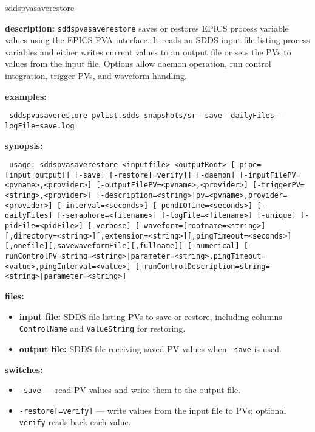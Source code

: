 \begin{sddsprog}{sddspvasaverestore}
\item \textbf{description:}
  \verb+sddspvasaverestore+ saves or restores EPICS process variable values using the EPICS PVA
  interface. It reads an SDDS input file listing process variables and either writes current
  values to an output file or sets the PVs to values from the input file. Options allow daemon
  operation, run control integration, trigger PVs, and waveform handling.
\item \textbf{examples:}
\begin{flushleft}{\tt
sddspvasaverestore pvlist.sdds snapshots/sr -save -dailyFiles -logFile=save.log\\
}\end{flushleft}
\item \textbf{synopsis:}
\begin{flushleft}{\tt
usage: sddspvasaverestore <inputfile> <outputRoot> [-pipe=[input|output]]\
  [-save] [-restore[=verify]]\
  [-daemon]\
    [-inputFilePV=<pvname>,<provider>] [-outputFilePV=<pvname>,<provider>]\
    [-triggerPV=<string>,<provider>]\
    [-description=<string>|pv=<pvname>,provider=<provider>]\
  [-interval=<seconds>] [-pendIOTime=<seconds>]\
  [-dailyFiles] [-semaphore=<filename>] [-logFile=<filename>]\
  [-unique] [-pidFile=<pidFile>] [-verbose]\
  [-waveform=[rootname=<string>][,directory=<string>][,extension=<string>][,pingTimeout=<seconds>][,onefile][,savewaveformFile][,fullname]]\
  [-numerical]\
  [-runControlPV={string=<string>|parameter=<string>},pingTimeout=<value>,pingInterval=<value>]\
  [-runControlDescription={string=<string>|parameter=<string>}]
}\end{flushleft}
\item \textbf{files:}
\begin{itemize}
  \item \textbf{input file:} SDDS file listing PVs to save or restore, including columns \verb|ControlName| and \verb|ValueString| for restoring.
  \item \textbf{output file:} SDDS file receiving saved PV values when \texttt{-save} is used.
\end{itemize}
\item \textbf{switches:}
\begin{itemize}
  \item {\tt -save} --- read PV values and write them to the output file.
  \item {\tt -restore[=verify]} --- write values from the input file to PVs; optional {\tt verify} reads back each value.

\end{itemize}
\end{sddsprog}
